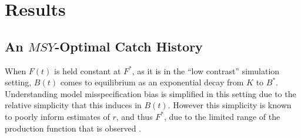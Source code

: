 
%
%

%
\clearpage

\section{Results}

%
\vspace{-0.45cm}
\subsection{An $MSY$-Optimal Catch History \label{flat}}

%
When $F(t)$ is held constant at $F^*$, as it is in the ``low contrast''
simulation setting, $B(t)$ comes to equilibrium as an exponential decay from
$K$ to $B^*$. Understanding model misspecification bias is simplified in this
setting due to the relative simplicity that this induces in $B(t)$. However
this simplicity is known to poorly inform estimates of $r$, and thus $F^*$,
due to the limited range of the production function that is observed
\cite{hilborn_quantitative_1992}.


